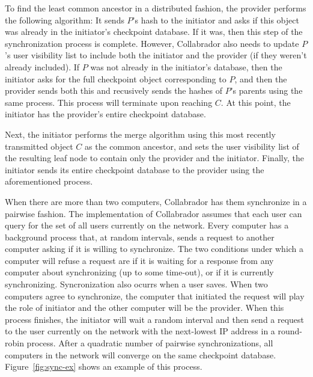 \documentclass[11pt,titlepage]{article}
\begin{document}
To find the least common ancestor in a distributed fashion, the
provider performs the following algorithm: It sends $P$'s hash to the
initiator and asks if this object was already in the initiator's
checkpoint database. If it was, then this step of the synchronization
process is complete. However, Collabrador also needs to update $P$'s
user visibility list to include both the initiator and the provider
(if they weren't already included). If $P$ was not already in the
initiator's database, then the initiator asks for the full checkpoint
object corresponding to $P$, and then the provider sends both this and
recusively sends the hashes of $P$'s parents using the same
process. This process will terminate upon reaching $C$. At this point,
the initiator has the provider's entire checkpoint database.

Next, the initiator performs the merge algorithm using this most
recently transmitted object $C$ as the common ancestor, and sets the
user visibility list of the resulting leaf node to contain only the
provider and the initiator. Finally, the initiator sends its entire
checkpoint database to the provider using the aforementioned process.

When there are more than two computers, Collabrador has them
synchronize in a pairwise fashion. The implementation of Collabrador
assumes that each user can query for the set of all users currently on
the network. Every computer has a background process that, at random
intervals, sends a request to another computer asking if it is willing
to synchronize.  The two conditions under which a computer will refuse
a request are if it is waiting for a response from any computer about
synchronizing (up to some time-out), or if it is currently
synchronizing. Syncronization also ocurrs when a user saves.  When two
computers agree to synchronize, the computer that initiated the
request will play the role of initiator and the other computer will be
the provider. When this process finishes, the initiator will wait a
random interval and then send a request to the user currently on the
network with the next-lowest IP address in a round-robin
process. After a quadratic number of pairwise synchronizations, all
computers in the network will converge on the same checkpoint
database. Figure~\ref{fig:sync-ex} shows an example of this process.
\end{document}
